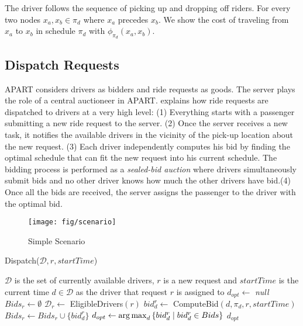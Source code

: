 The driver follows the sequence of picking up and dropping off riders. For every two nodes $x_a, x_b \in \pi_d$ where $x_a$ precedes $x_b$. We show the cost of traveling from $x_a$ to $x_b$ in schedule $\pi_d$ with $\phi_{\pi_d}(x_a, x_b)$.

\subsection{Dispatch Requests}
\label{subsec:dispatch}
APART considers drivers as bidders and ride requests as goods. The server plays the role of a central auctioneer in APART.  explains how ride requests are dispatched to drivers at a very high level: (1) Everything starts with a passenger submitting a new ride request to the server. (2) Once the server receives a new task, it notifies the available drivers in the vicinity of the pick-up location about the new request. (3) Each driver independently computes his bid by finding the optimal schedule that can fit the new request into his current schedule. The bidding process is performed as a \textit{sealed-bid auction} where drivers simultaneously submit bids and no other driver knows how much the other drivers have bid.(4) Once all the bids are received, the server assigns the passenger to the driver with the optimal bid.

\begin{figure}[!ht]
	\centering
	\texttt{[image: fig/scenario]}
	\vspace{-3mm}\caption{Simple Scenario}\label{fig:scenario}
\end{figure}

\begin{algorithm}
\caption{Dispatch($\mathcal{D}, r, startTime$)}
\label{algo:dispatch}
\begin{algorithmic}[1]
\REQUIRE $\mathcal{D}$ is the set of currently available drivers, $r$ is a new request and $startTime$ is the current time
\ENSURE $d \in \mathcal{D}$ as the driver that request $r$ is assigned to
\STATE $d_{opt} \leftarrow $ \emph{null}
\STATE $Bids_r \leftarrow \emptyset$
\STATE $\mathcal{D}_r \leftarrow$ EligibleDrivers$(r)$
 \label{line:loop_start}
	\STATE $bid_d^r \leftarrow $ ComputeBid$(d, \pi_d, r, startTime)$ \label{line:compute}
	\STATE $Bids_r \leftarrow Bids_r \cup \{bid_d^r\}$
\ENDFOR \label{line:loop_end}
\STATE $d_{opt} \leftarrow \operatorname*{arg\,max}_d \left\lbrace bid_d^r \mid bid_d^r \in Bids \right\rbrace$ \label{line:select}
\RETURN $d_{opt}$
\end{algorithmic}
\end{algorithm}

